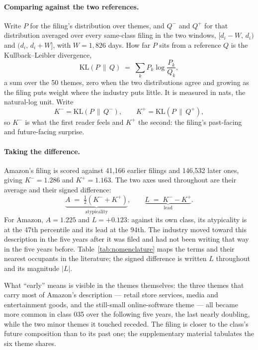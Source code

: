 \paragraph{Comparing against the two references.} Write $P$ for the filing's
distribution over themes, and $Q^{-}$ and $Q^{+}$
for that distribution averaged over every same-class filing in the two
windows, $[d_i - W,\, d_i)$ and $(d_i,\, d_i + W]$, with $W = 1{,}826$ days.
How far $P$ sits from a reference $Q$ is the Kullback--Leibler divergence,
\[
  \mathrm{KL}(P \,\|\, Q) \;=\; \sum_{k} P_k \log \frac{P_k}{Q_k},
\]
a sum over the 50 themes, zero when the two distributions agree and growing as
the filing puts weight where the industry puts little. It is measured in nats,
the natural-log unit. Write
\[
  K^{-} = \mathrm{KL}(P \,\|\, Q^{-}),
  \qquad
  K^{+} = \mathrm{KL}(P \,\|\, Q^{+}),
\]
so $K^{-}$ is what the first reader feels and $K^{+}$ the second: the
filing's past-facing and future-facing surprise.

\paragraph{Taking the difference.} Amazon's filing is scored against 41{,}166
earlier filings and 146{,}532 later ones, giving $K^{-} = 1.286$ and
$K^{+} = 1.163$. The two axes used throughout are their average and their
signed difference:
\[
  \underbrace{A \;=\; \tfrac{1}{2}\left(K^{-} + K^{+}\right)}_{\text{atypicality}},
  \qquad
  \underbrace{L \;=\; K^{-} - K^{+}}_{\text{lead}} .
\]
For Amazon, $A = 1.225$ and $L = +0.123$: against its own class, its
atypicality is at the 47th percentile and its lead at the 94th. The
industry moved toward this description in the five years after it was filed
and had not been writing that way in the five years before.
Table~\ref{tab:nomenclature} maps the terms and their nearest occupants
in the literature; the signed difference is written $L$ throughout and
its magnitude $|L|$.

What ``early'' means is visible in the themes themselves: the three themes
that carry most of Amazon's description --- retail store services, media
and entertainment goods, and the still-small online-software theme --- all
became more common in class 035 over the following five years, the last
nearly doubling, while the two minor themes it touched receded. The filing
is closer to the class's future composition than to its past one; the
supplementary material tabulates the six theme shares.

